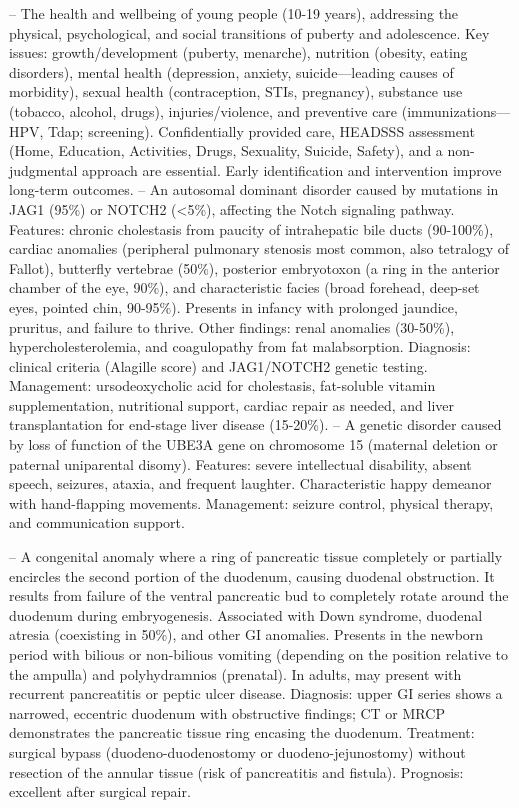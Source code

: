 -- The health and wellbeing of young people (10-19 years), addressing the physical, psychological, and social transitions of puberty and adolescence. Key issues: growth/development (puberty, menarche), nutrition (obesity, eating disorders), mental health (depression, anxiety, suicide—leading causes of morbidity), sexual health (contraception, STIs, pregnancy), substance use (tobacco, alcohol, drugs), injuries/violence, and preventive care (immunizations—HPV, Tdap; screening). Confidentially provided care, HEADSSS assessment (Home, Education, Activities, Drugs, Sexuality, Suicide, Safety), and a non-judgmental approach are essential. Early identification and intervention improve long-term outcomes.
-- An autosomal dominant disorder caused by mutations in JAG1 (95\%) or NOTCH2 (<5\%), affecting the Notch signaling pathway. Features: chronic cholestasis from paucity of intrahepatic bile ducts (90-100\%), cardiac anomalies (peripheral pulmonary stenosis most common, also tetralogy of Fallot), butterfly vertebrae (50\%), posterior embryotoxon (a ring in the anterior chamber of the eye, 90\%), and characteristic facies (broad forehead, deep-set eyes, pointed chin, 90-95\%). Presents in infancy with prolonged jaundice, pruritus, and failure to thrive. Other findings: renal anomalies (30-50\%), hypercholesterolemia, and coagulopathy from fat malabsorption. Diagnosis: clinical criteria (Alagille score) and JAG1/NOTCH2 genetic testing. Management: ursodeoxycholic acid for cholestasis, fat-soluble vitamin supplementation, nutritional support, cardiac repair as needed, and liver transplantation for end-stage liver disease (15-20\%).
-- A genetic disorder caused by loss of function of the UBE3A gene on chromosome 15 (maternal deletion or paternal uniparental disomy). Features: severe intellectual disability, absent speech, seizures, ataxia, and frequent laughter. Characteristic happy demeanor with hand-flapping movements. Management: seizure control, physical therapy, and communication support.

-- A congenital anomaly where a ring of pancreatic tissue completely or partially encircles the second portion of the duodenum, causing duodenal obstruction. It results from failure of the ventral pancreatic bud to completely rotate around the duodenum during embryogenesis. Associated with Down syndrome, duodenal atresia (coexisting in 50\%), and other GI anomalies. Presents in the newborn period with bilious or non-bilious vomiting (depending on the position relative to the ampulla) and polyhydramnios (prenatal). In adults, may present with recurrent pancreatitis or peptic ulcer disease. Diagnosis: upper GI series shows a narrowed, eccentric duodenum with obstructive findings; CT or MRCP demonstrates the pancreatic tissue ring encasing the duodenum. Treatment: surgical bypass (duodeno-duodenostomy or duodeno-jejunostomy) without resection of the annular tissue (risk of pancreatitis and fistula). Prognosis: excellent after surgical repair.

